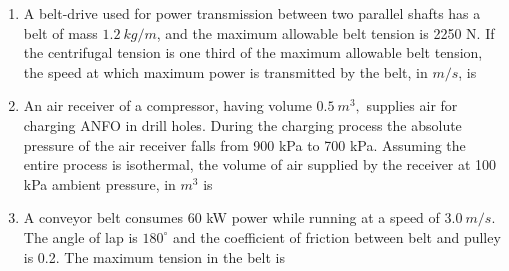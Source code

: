 \documentclass[journal,12pt,onecolumn]{IEEEtran}
\theoremstyle{remark}
\begin{document}
\begin{enumerate}
\item A belt-drive used for power transmission between two parallel shafts has a belt of mass $1.2~kg/m$, and the maximum allowable belt tension is 2250 N. If the centrifugal tension is one third of the maximum allowable belt tension, the speed at which maximum power is transmitted by the belt, in $m/s$, is

\hfill{}

\begin{enumerate}
\end{enumerate}

\item An air receiver of a compressor, having volume $0.5~m^{3},$ supplies air for charging ANFO in drill holes. During the charging process the absolute pressure of the air receiver falls from 900 kPa to 700 kPa. Assuming the entire process is isothermal, the volume of air supplied by the receiver at 100 kPa ambient pressure, in $m^{3}$ is

\hfill{}

\begin{enumerate}
\end{enumerate}

\item A conveyor belt consumes 60 kW power while running at a speed of $3.0~m/s$. The angle of lap is $180^{\circ}$ and the coefficient of friction between belt and pulley is 0.2. The maximum tension  in the belt is

\hfill{}

\begin{enumerate}
\end{enumerate}


\end{enumerate}
\end{document}

